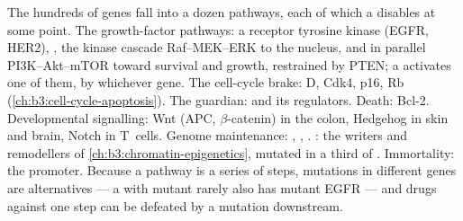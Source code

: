 \begin{proposition}\label{prop:b3:cancer-biology:pathways}
The hundreds of  genes fall into a dozen pathways, each of which
a  disables at some point. The growth-factor pathways: a receptor
tyrosine kinase (EGFR, HER2), , the kinase cascade Raf--MEK--ERK to
the nucleus, and in parallel PI3K--Akt--mTOR toward survival and growth,
restrained by PTEN; a  activates one of them, by whichever gene.
The cell-cycle brake:  D, Cdk4, p16, Rb (\cref{ch:b3:cell-cycle-apoptosis}).
The guardian:  and its regulators. Death: Bcl-2. Developmental
signalling: Wnt (APC, $\beta$-catenin) in the colon, Hedgehog in skin
and brain, Notch in T~cells. Genome maintenance: ,
, . : the writers and remodellers of
\cref{ch:b3:chromatin-epigenetics}, mutated in a third of .
Immortality: the  promoter. Because a pathway is a series of
steps, mutations in different genes are alternatives --- a  with
mutant  rarely also has mutant EGFR --- and drugs against one step
can be defeated by a mutation downstream.
\end{proposition}

